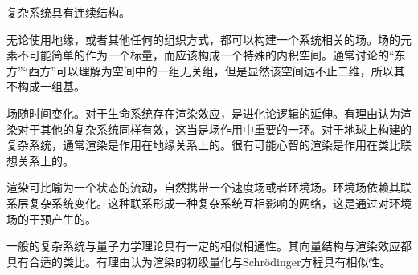 \documentclass{ctexart}
\begin{document}
复杂系统具有连续结构。

无论使用地缘，或者其他任何的组织方式，都可以构建一个系统相关的场。场的元素不可能简单的作为一个标量，而应该构成一个特殊的内积空间。通常讨论的“东方”“西方”可以理解为空间中的一组无关组，但是显然该空间远不止二维，所以其不构成一组基。

场随时间变化。对于生命系统存在渲染效应，是进化论逻辑的延伸。有理由认为渲染对于其他的复杂系统同样有效，这当是场作用中重要的一环。对于地球上构建的复杂系统，通常渲染是作用在地缘关系上的。很有可能心智的渲染是作用在类比联想关系上的。

渲染可比喻为一个状态的流动，自然携带一个速度场或者环境场。环境场依赖其联系层复杂系统变化。这种联系形成一种复杂系统互相影响的网络，这是通过对环境场的干预产生的。

一般的复杂系统与量子力学理论具有一定的相似相通性。其向量结构与渲染效应都具有合适的类比。有理由认为渲染的初级量化与Schrödinger方程具有相似性。
\end{document}
